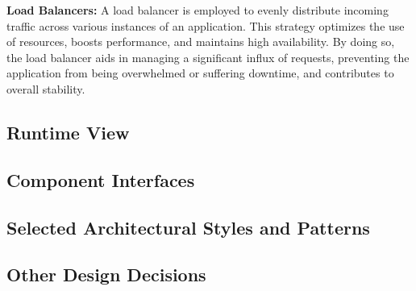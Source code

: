 \indent \textbf{Load Balancers:} A load balancer is employed to evenly distribute incoming traffic across various instances of an application. This strategy optimizes the use of resources, boosts performance, and maintains high availability. By doing so, the load balancer aids in managing a significant influx of requests, preventing the application from being overwhelmed or suffering downtime, and contributes to overall stability.



\subsection{Runtime View}




\subsection{Component Interfaces}



\subsection{Selected Architectural Styles and Patterns}




\subsection{Other Design Decisions}


